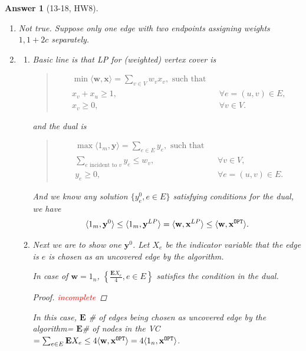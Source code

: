 \documentclass[11pt]{article}
\theoremstyle{numberplain}
\theoremstyle{nonumberplain}
\newtheorem{proof}{Proof}
\newtheorem{ans}{Answer}
\newcommand{\0}{{\mathbf{0}}}
\newcommand{\w}{{\mathbf{w}}}
\newcommand{\x}{{\mathbf{x}}}
\newcommand{\y}{{\mathbf{y}}}
\newcommand{\E}{{\mathbf{E}}}
\begin{document}
\begin{ans}[13-18, HW8]
\begin{enumerate}
\item  Not true. Suppose only one edge with two endpoints assigning weights $1,1+2c$ separately.

\item \begin{enumerate}
\item
Basic line is that LP for (weighted) vertex cover is 
\begin{quote}
\begin{eqnarray*}
\min \langle \w, \x \rangle=\sum_{v\in V}w_v x_v, \text{ such that} \\
x_v + x_u\geq 1,&& \forall e=(u,v)\in E, \\
x_v\geq 0, && \forall v\in V.
\end{eqnarray*}
\end{quote}

and the dual is 

\begin{quote}
\begin{eqnarray*}
\max 	\langle 1_{m},\y \rangle=\sum_{e\in E} y_e, \text{ such that} \\
\sum_{e\text{ incident to }v}y_e\leq w_v,&& \forall v\in V, \\
y_e\geq 0, && \forall e=(u,v)\in E.
\end{eqnarray*}
\end{quote}

And we know any solution $\{y_e^0,e\in E\}$ satisfying conditions for the dual, we have 
$$ \langle 1_m,\y^0 \rangle \leq \langle 1_m, \y^{LP}\rangle =\langle \w, \x^{LP} \rangle \leq \langle \w, \x^{\tt OPT} \rangle .$$

\item Next we are to show one $\y^0$. Let $X_e$ be the indicator variable that the edge is $e$ is chosen as an uncovered edge by the algorithm. 

\begin{claim}
In case of $\w=1_n$, $\left\{\frac{\E X_e}{4},e\in E\right\}$ satisfies the condition in the dual.
\end{claim}
\begin{proof} \textcolor{red}{incomplete}
\end{proof}

In this case, $\E$ \# of edges being chosen as uncovered edge by the algorithm= $\E$\# of nodes in the VC $=\sum_{e\in E}\E X_e \leq 4 \langle \w, \x^{\tt OPT} \rangle =4 \langle 1_n, \x^{\tt OPT} \rangle $.
\end{enumerate}
\end{enumerate}
\end{ans}
\end{document}
